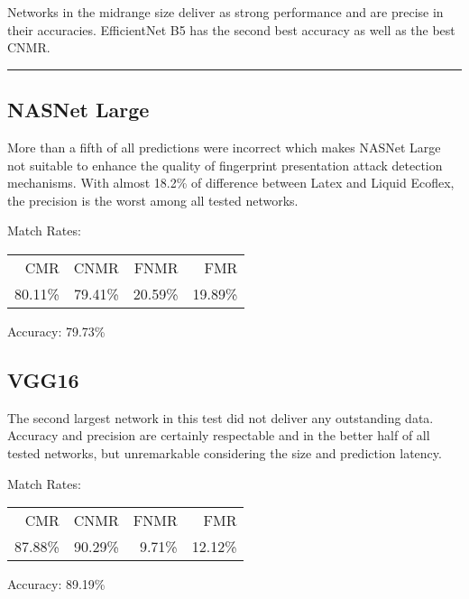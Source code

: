 Networks in the midrange size deliver as strong performance and are precise in their accuracies.
EﬀicientNet B5 has the second best accuracy as well as the best CNMR.

\bigskip\hrule


\subsection{NASNet Large}
\begin{minipage}[c]{0.7\textwidth}
    More than a fifth of all predictions were incorrect which makes NASNet Large not suitable to enhance the quality of fingerprint presentation attack detection mechanisms.
    With almost 18.2\% of difference between Latex and Liquid Ecoflex, the precision is the worst among all tested networks.

    \medskip\centering Match Rates: 
    \begin{tabular}{ r  r  r  r |}
        CMR       & CNMR      & FNMR     & FMR     \\
        80.11\%   & 79.41\%   & 20.59\%  & 19.89\%  \\
    \end{tabular} \hspace{2mm} Accuracy: 79.73\%
\end{minipage}
\hfill
\begin{minipage}[t]{0.3\textwidth}
    \centering
    
\end{minipage}



\subsection{VGG16}
\begin{minipage}[c]{0.7\textwidth}
    The second largest network in this test did not deliver any outstanding data.
    Accuracy and precision are certainly respectable and in the better half of all tested networks, but unremarkable considering the size and prediction latency.

    \medskip\centering Match Rates: 
    \begin{tabular}{ r  r  r  r |}
        CMR       & CNMR      & FNMR     & FMR     \\
        87.88\%   & 90.29\%   & 9.71\%   & 12.12\%  \\
    \end{tabular} \hspace{2mm} Accuracy: 89.19\%
\end{minipage}
\hfill
\begin{minipage}[c]{0.3\textwidth}
    \centering
    
\end{minipage}



